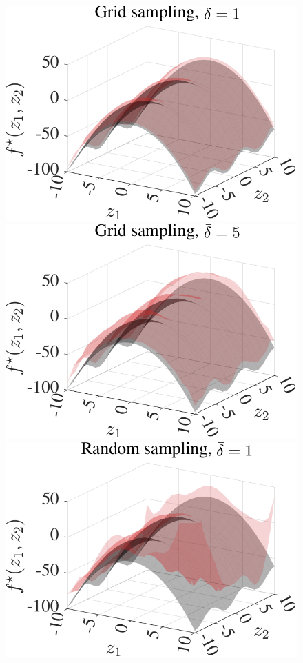 \begin{figure}[t]
	\centering
	\includegraphics[scale=0.4]{../images/chap2_numex_ex1_grid_1.pdf} \hspace{5pt}
	\includegraphics[scale=0.4]{../images/chap2_numex_ex1_grid_5.pdf} \\[13pt]
	\includegraphics[scale=0.4]{../images/chap2_numex_ex1_rnd_1.pdf} \hspace{5pt}

\end{figure}
